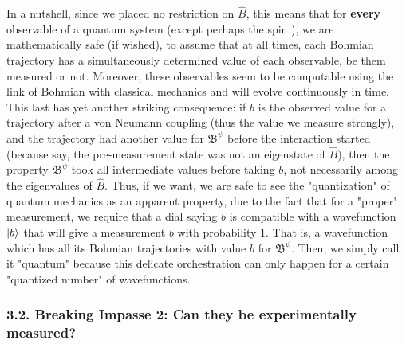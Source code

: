 \documentclass[11pt, a4paper]{article} %
\newcommand{\B}{\mathfrak{B}}
\begin{document}
In a nutshell, since we placed no restriction on $\hat{B}$, this means that for {\bf every} observable of a quantum system (except perhaps the spin \cite{spin}), we are mathematically safe (if wished), to assume that at all times, each Bohmian trajectory has a simultaneously determined value of each observable, be them measured or not. Moreover, these observables seem to be computable using the link of Bohmian with classical mechanics and will evolve continuously in time. This last has yet another striking consequence: if $b$ is the observed value for a trajectory after a von Neumann coupling (thus the value we measure strongly), and the trajectory had another value for $\B^\psi$ before the interaction started (because say, the pre-measurement state was not an eigenstate of $\hat{B}$), then the property $\B^\psi$ took all intermediate values before taking $b$, not necessarily among the eigenvalues of $\hat{B}$. Thus, if we want, we are safe to see the "quantization" of quantum mechanics as an apparent property, due to the fact that for a "proper" measurement, we require that a dial saying $b$ is compatible with a wavefunction $\ket{b}$ that will give a measurement $b$ with probability 1. That is, a wavefunction which has all its Bohmian trajectories with value $b$ for $\B^\psi$. Then, we simply call it "quantum" because this delicate orchestration can only happen for a certain "quantized number" of wavefunctions.


\subsubsection*{3.2. Breaking Impasse 2: Can they be experimentally measured?}\vspace{-0.15cm}
\end{document}
